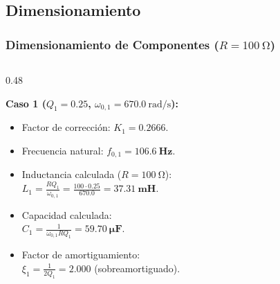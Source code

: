 \documentclass[aspectratio=169, 10pt]{beamer}
\begin{document}
\subsection{Dimensionamiento}
\begin{frame}
  \frametitle{Dimensionamiento de Componentes ($R = \qty{100}{\ohm}$)}

  \begin{columns}[t, onlytextwidth]
    \begin{column}{0.48\textwidth}
      \begin{tarjeta}
        {\fontsize{9pt}{11pt}\selectfont \textbf{\color{NavyDark} Caso 1 ($Q_1 = 0.25$, $\omega_{0,1} = \qty{670.0}{\radian\per\second}$):}}\\[2pt]
        {\fontsize{8pt}{10pt}\selectfont
        \begin{itemize}\setlength{\itemsep}{2.5pt}
          \item Factor de corrección: $K_1 = \mathbf{0.2666}$.
          \item Frecuencia natural: $f_{0,1} = \mathbf{\qty{106.6}{\hertz}}$.
          \item Inductancia calculada ($R = \qty{100}{\ohm}$):\\
          $L_1 = \frac{R Q_1}{\omega_{0,1}} = \frac{100 \cdot 0.25}{670.0} = \mathbf{\qty{37.31}{\milli\henry}}$.
          \item Capacidad calculada:\\
          $C_1 = \frac{1}{\omega_{0,1} R Q_1} = \mathbf{\qty{59.70}{\micro\farad}}$.
          \item Factor de amortiguamiento:\\
          $\xi_1 = \frac{1}{2 Q_1} = \mathbf{2.000}$ (sobreamortiguado).
        \end{itemize}
        }
      \end{tarjeta}
    \end{column}


\end{columns}
\end{frame}
\end{document}

